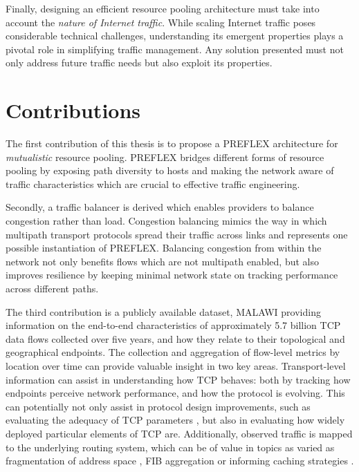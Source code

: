 Finally, designing an efficient resource pooling architecture must take into account the \emph{nature of Internet traffic}.
While scaling Internet traffic poses considerable technical challenges, understanding its emergent properties plays a pivotal role in simplifying traffic management.
Any solution presented must not only address future traffic needs but also exploit its properties.

\section{Contributions}

The first contribution of this thesis is to propose a \ac{PREFLEX} architecture for \emph{mutualistic} resource pooling.
\ac{PREFLEX} bridges different forms of resource pooling by exposing path diversity to hosts and making the network aware of traffic characteristics which are crucial to effective traffic engineering.

Secondly, a traffic balancer is derived which enables providers to balance congestion rather than load.
Congestion balancing mimics the way in which multipath transport protocols spread their traffic across links and represents one possible instantiation of \ac{PREFLEX}.
Balancing congestion from within the network not only benefits flows which are not multipath enabled, but also improves resilience by keeping minimal network state on tracking performance across different paths.

The third contribution is a publicly available dataset, \ac{MALAWI} providing information on the end-to-end characteristics of approximately 5.7 billion \ac{TCP} data flows collected over five years, and how they relate to their topological and geographical endpoints. The collection and aggregation of flow-level metrics by location over time can provide valuable insight in two key areas. Transport-level information can assist in understanding how \ac{TCP} behaves: both by tracking how endpoints perceive network performance, and how the protocol is evolving. This can potentially not only assist in protocol design improvements, such as evaluating the adequacy of \ac{TCP} parameters \cite{Dukkipati:2010p160}, but also in evaluating how widely deployed particular elements of \ac{TCP} are. Additionally, observed traffic is mapped to the underlying routing system, which can be of value in topics as varied as fragmentation of address space \cite{Cittadini:2010p431}, \ac{FIB} aggregation \cite{Ballani:2008p199} or informing caching strategies \cite{Psaras:2011p487}.

